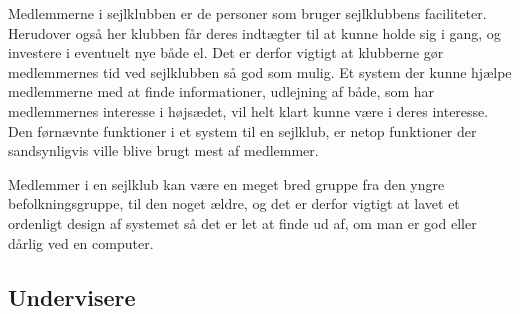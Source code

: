 Medlemmerne i sejlklubben er de personer som bruger sejlklubbens faciliteter. Herudover også her klubben får deres
indtægter til at kunne holde sig i gang, og investere i eventuelt nye både el. Det er derfor vigtigt at klubberne gør
medlemmernes tid ved sejlklubben så god som mulig. Et system der kunne hjælpe medlemmerne med at finde informationer,
udlejning af både, som har medlemmernes interesse i højsædet, vil helt klart kunne være i deres interesse. Den førnævnte
funktioner i et system til en sejlklub, er netop funktioner der sandsynligvis ville blive brugt mest af medlemmer.

Medlemmer i en sejlklub kan være en meget bred gruppe fra den yngre befolkningsgruppe, til den noget ældre, og det er
derfor vigtigt at lavet et ordenligt design af systemet så det er let at finde ud af, om man er god eller dårlig ved en
computer.





\subsection{Undervisere}

